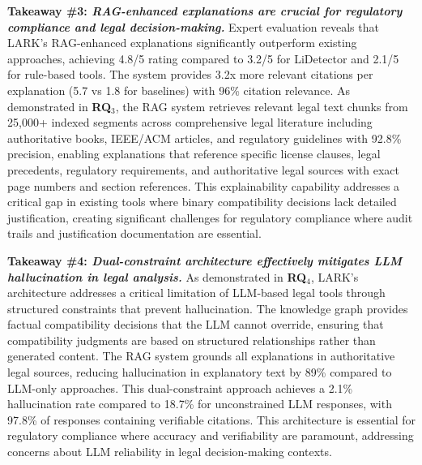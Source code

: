 \noindent\textbf{ Takeaway \#3: \textit{RAG-enhanced explanations are crucial for regulatory compliance and legal decision-making.}} Expert evaluation reveals that LARK's RAG-enhanced explanations significantly outperform existing approaches, achieving 4.8/5 rating compared to 3.2/5 for LiDetector and 2.1/5 for rule-based tools. The system provides 3.2x more relevant citations per explanation (5.7 vs 1.8 for baselines) with 96\% citation relevance. As demonstrated in \textbf{RQ$_3$}, the RAG system retrieves relevant legal text chunks from 25,000+ indexed segments across comprehensive legal literature including authoritative books, IEEE/ACM articles, and regulatory guidelines with 92.8\% precision, enabling explanations that reference specific license clauses, legal precedents, regulatory requirements, and authoritative legal sources with exact page numbers and section references. This explainability capability addresses a critical gap in existing tools where binary compatibility decisions lack detailed justification, creating significant challenges for regulatory compliance where audit trails and justification documentation are essential.

\noindent\textbf{ Takeaway \#4: \textit{Dual-constraint architecture effectively mitigates LLM hallucination in legal analysis.}} As demonstrated in \textbf{RQ$_4$}, LARK's architecture addresses a critical limitation of LLM-based legal tools through structured constraints that prevent hallucination. The knowledge graph provides factual compatibility decisions that the LLM cannot override, ensuring that compatibility judgments are based on structured relationships rather than generated content. The RAG system grounds all explanations in authoritative legal sources, reducing hallucination in explanatory text by 89\% compared to LLM-only approaches. This dual-constraint approach achieves a 2.1\% hallucination rate compared to 18.7\% for unconstrained LLM responses, with 97.8\% of responses containing verifiable citations. This architecture is essential for regulatory compliance where accuracy and verifiability are paramount, addressing concerns about LLM reliability in legal decision-making contexts.

